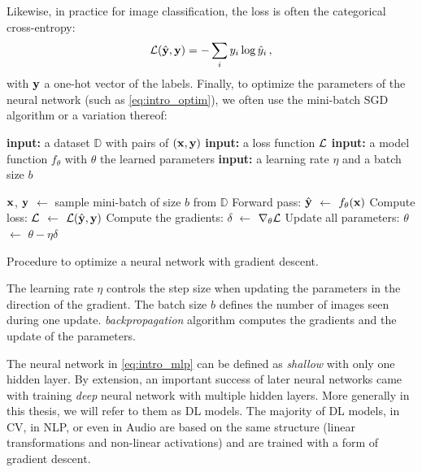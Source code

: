 Likewise, in practice for image classification, the loss is often the categorical cross-entropy:
%
\begin{equation}
      \mathcal{L}(\hat{\mathbf{y}}, \mathbf{y}) = -\sum_i y_i \log \hat{y}_i\,,
      \label{eq:intro_ce}
\end{equation}
%
\noindent with $\mathbf{y}$ a one-hot vector of the labels. Finally, to optimize the parameters of the neural
network (such as \autoref{eq:intro_optim}), we often use the mini-batch \ac{SGD} algorithm or a variation thereof:

\begin{algorithm}
      \begin{algorithmic}[1]
            \Statex \textbf{input:} a dataset $\mathbb{D}$ with pairs of $(\mathbf{x}, \mathbf{y})$
            \Statex \textbf{input:} a loss function $\mathcal{L}$
            \Statex \textbf{input:} a model function $f_\theta$ with $\theta$ the learned parameters
            \Statex \textbf{input:} a learning rate $\eta$ and a batch size $b$
            \Statex

            \State $\mathbf{x}$, $\mathbf{y}$ $\gets$ sample mini-batch of size $b$ from $\mathbb{D}$
            \State Forward pass: $\hat{\mathbf{y}}$ $\gets$ $f_\theta(\mathbf{x})$
            \State Compute loss: $\mathcal{L}$ $\gets$ $\mathcal{L}(\hat{\mathbf{y}}, \mathbf{y})$
            \State Compute the gradients: $\delta$ $\gets$ $\nabla_\theta \mathcal{L}$
            \State Update all parameters: $\theta$ $\gets$ $\theta - \eta \delta$
            \EndWhile
      \end{algorithmic}
      \caption{Procedure to optimize a neural network with gradient descent.}
      \label{algo:intro_sgd}
\end{algorithm}

The learning rate $\eta$ controls the step size when updating the parameters in the direction of the
gradient. The batch size $b$ defines the number of images seen during one update.
\textit{backpropagation} algorithm computes the gradients and the update of the parameters.

The neural network in \autoref{eq:intro_mlp} can be defined as \textit{shallow} with only one hidden layer.
By extension, an important success of later neural networks came with training \textit{deep} neural
network with multiple hidden layers. More generally in this thesis, we will refer to them as \acf{DL}
models.
The majority of \ac{DL} models, in \acf{CV}, in \acf{NLP}, or even in Audio are based on the same structure
(linear transformations and non-linear activations) and are trained with a form of gradient descent.

